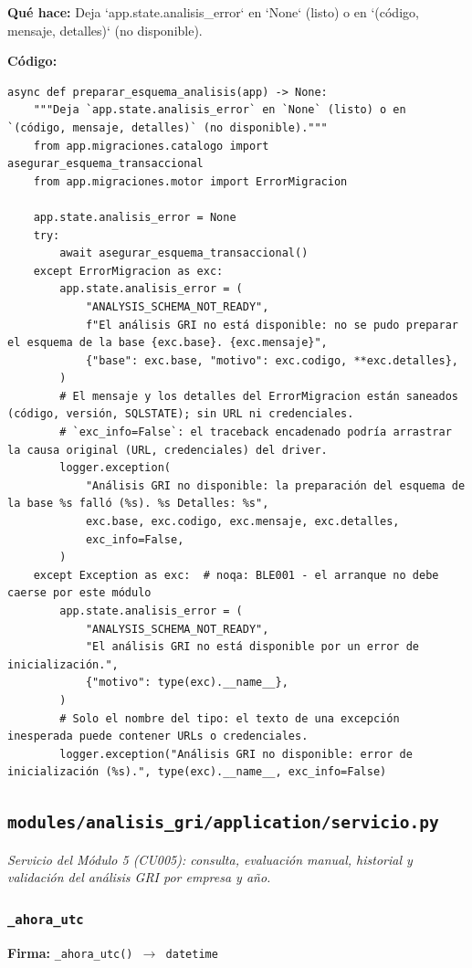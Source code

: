 \documentclass[11pt,a4paper]{article}
\begin{document}
\textbf{Qué hace:} Deja `app.state.analisis\_error` en `None` (listo) o en `(código, mensaje, detalles)` (no disponible).

\textbf{Código:}
\begin{lstlisting}
async def preparar_esquema_analisis(app) -> None:
    """Deja `app.state.analisis_error` en `None` (listo) o en `(código, mensaje, detalles)` (no disponible)."""
    from app.migraciones.catalogo import asegurar_esquema_transaccional
    from app.migraciones.motor import ErrorMigracion

    app.state.analisis_error = None
    try:
        await asegurar_esquema_transaccional()
    except ErrorMigracion as exc:
        app.state.analisis_error = (
            "ANALYSIS_SCHEMA_NOT_READY",
            f"El análisis GRI no está disponible: no se pudo preparar el esquema de la base {exc.base}. {exc.mensaje}",
            {"base": exc.base, "motivo": exc.codigo, **exc.detalles},
        )
        # El mensaje y los detalles del ErrorMigracion están saneados (código, versión, SQLSTATE); sin URL ni credenciales.
        # `exc_info=False`: el traceback encadenado podría arrastrar la causa original (URL, credenciales) del driver.
        logger.exception(
            "Análisis GRI no disponible: la preparación del esquema de la base %s falló (%s). %s Detalles: %s",
            exc.base, exc.codigo, exc.mensaje, exc.detalles,
            exc_info=False,
        )
    except Exception as exc:  # noqa: BLE001 - el arranque no debe caerse por este módulo
        app.state.analisis_error = (
            "ANALYSIS_SCHEMA_NOT_READY",
            "El análisis GRI no está disponible por un error de inicialización.",
            {"motivo": type(exc).__name__},
        )
        # Solo el nombre del tipo: el texto de una excepción inesperada puede contener URLs o credenciales.
        logger.exception("Análisis GRI no disponible: error de inicialización (%s).", type(exc).__name__, exc_info=False)
\end{lstlisting}

\subsection{\texttt{modules/analisis\_gri/application/servicio.py}}
\textit{Servicio del Módulo 5 (CU005): consulta, evaluación manual, historial y validación del análisis GRI por empresa y año.}

\subsubsection*{\texttt{\_ahora\_utc}}
\textbf{Firma:} \texttt{\_ahora\_utc() $\rightarrow$ datetime}
\end{document}
